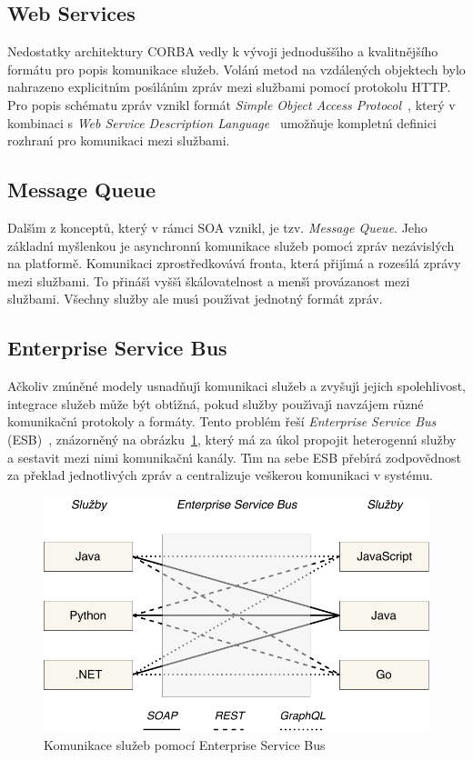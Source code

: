 \subsection{Web Services}

Nedostatky architektury \gls{CORBA} vedly k vývoji jednodušš\'{\i}ho
a kvalitnějšího formátu pro popis komunikace služeb. Volán\'{\i} metod na vzdálen\'ych objektech
bylo nahrazeno explicitn\'{\i}m pos\'{\i}lán\'{\i}m zpráv mezi službami pomocí protokolu \gls{HTTP}.
Pro popis schématu zpráv vznikl formát \textit{Simple Object Access
Protocol}~\cite{box2000simple}, kter\'y v kombinaci s
\textit{Web Service Description Language}~\cite{christensen2001web}
umožňuje kompletn\'{\i} definici rozhran\'{\i} pro komunikaci mezi službami.

\subsection{Message Queue}

Dalš\'{\i}m z konceptů, kter\'y v rámci \gls{SOA} vznikl, je tzv. \textit{Message Queue}.
Jeho základn\'{\i} myšlenkou je asynchronn\'{\i} komunikace služeb pomoc\'{\i} zpráv nezávisl\'ych
na platformě. Komunikaci zprostředkovává fronta, která přij\'{\i}má a rozes\'{\i}lá
zprávy mezi službami. To přináš\'{\i} vyšš\'{\i} škálovatelnost a menš\'{\i} provázanost
mezi službami. Všechny služby ale mus\'{\i} použ\'{\i}vat jednotn\'y formát zpráv.

\subsection{Enterprise Service Bus}

Ačkoliv zm\'{\i}něné modely usnadňuj\'{\i} komunikaci služeb a zvyšuj\'{\i} jejich
spolehlivost, integrace služeb může b\'yt obt\'{\i}žná, pokud služby použ\'{\i}vaj\'{\i}
navzájem různé komunikačn\'{\i} protokoly a formáty. Tento problém řeší \textit{Enterprise Service
Bus} (\gls{ESB})~\cite{chappell2004enterprise}, znázorněn\'y na obrázku~\ref{fig:enterprise-service-bus},
kter\'y má za úkol propojit heterogenn\'{\i} služby a sestavit mezi nimi komunikačn\'{\i} kanály.
T\'{\i}m na sebe \gls{ESB} přeb\'{\i}rá zodpovědnost za překlad jednotliv\'ych zpráv a centralizuje
veškerou komunikaci v systému.

\begin{figure}
    \centering
    \includegraphics[keepaspectratio=true, width=0.6\linewidth]{figures/enterprise-service-bus.pdf}
    \caption{Komunikace služeb pomocí Enterprise Service Bus}
    \label{fig:enterprise-service-bus}
\end{figure}

